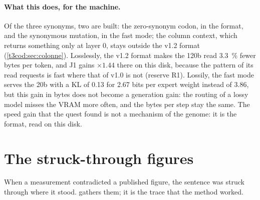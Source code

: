 \paragraph{What this does, for the machine.} Of the three synonyms, two are built: the zero-synonym codon, in the format, and the synonymous mutation, in the fast mode; the column context, which returns something only at layer 0, stays outside the v1.2 format (\cref{t3cod:sec:colonne}). Losslessly, the v1.2 format makes the 120b read \SI{3.3}{\percent} fewer bytes per token, and J1 gains $\times 1.44$ there on this disk, because the pattern of its read requests is fast where that of v1.0 is not (reserve R1). Lossily, the fast mode serves the 20b with a KL of \num{0.13} for \num{2.67} bits per expert weight instead of \num{3.86}, but this gain in bytes does not become a generation gain: the routing of a lossy model misses the VRAM more often, and the bytes per step stay the same. The speed gain that the quest found is not a mechanism of the genome: it is the format, read on this disk.

\section{The struck-through figures}\label{t3dis:sec:barres}

When a measurement contradicted a published figure, the sentence was struck through where it stood.  gathers them; it is the trace that the method worked.

